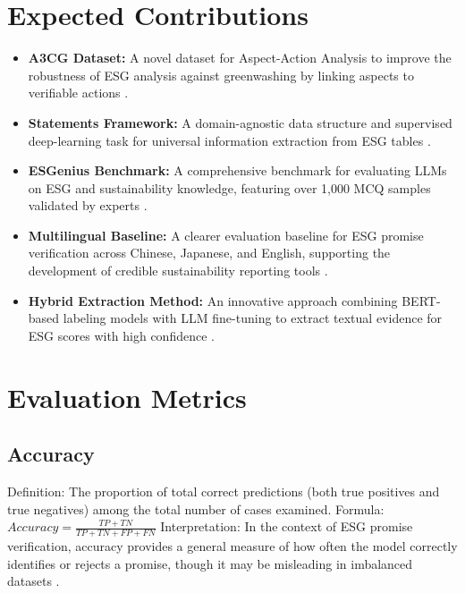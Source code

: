 \documentclass{article}
\begin{document}
\section{Expected Contributions}
\begin{itemize}
\item \textbf{A3CG Dataset:} A novel dataset for Aspect-Action Analysis to improve the robustness of ESG analysis against greenwashing by linking aspects to verifiable actions \citep{Towards Robust ESG Analysis Against Greenwashing Risks: Aspect-Action Analysis with Cross-Category Generalization}.
\item \textbf{Statements Framework:} A domain-agnostic data structure and supervised deep-learning task for universal information extraction from ESG tables \citep{Statements: Universal Information Extraction from Tables with Large Language Models for ESG KPIs}.
\item \textbf{ESGenius Benchmark:} A comprehensive benchmark for evaluating LLMs on ESG and sustainability knowledge, featuring over 1,000 MCQ samples validated by experts \citep{ESGenius: Benchmarking LLMs on Environmental, Social, and Governance (ESG) and Sustainability Knowledge}.
\item \textbf{Multilingual Baseline:} A clearer evaluation baseline for ESG promise verification across Chinese, Japanese, and English, supporting the development of credible sustainability reporting tools \citep{Multilingual Promise Verification in ESG Reports with Large Language Model Performance Evaluation}.
\item \textbf{Hybrid Extraction Method:} An innovative approach combining BERT-based labeling models with LLM fine-tuning to extract textual evidence for ESG scores with high confidence \citep{Textual Evidence Extraction for ESG Scores}.
\end{itemize}

\section{Evaluation Metrics}
\subsection{Accuracy}
Definition: The proportion of total correct predictions (both true positives and true negatives) among the total number of cases examined.
Formula: $Accuracy = \frac{TP + TN}{TP + TN + FP + FN}$
Interpretation: In the context of ESG promise verification, accuracy provides a general measure of how often the model correctly identifies or rejects a promise, though it may be misleading in imbalanced datasets \citep{Multilingual Promise Verification in ESG Reports with Large Language Model Performance Evaluation}.
\end{document}
